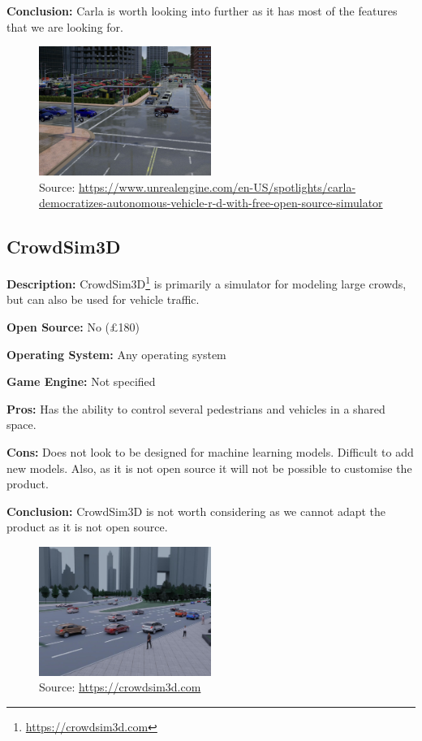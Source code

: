 \textbf{Conclusion:} Carla is worth looking into further as it has most of the features that we are looking for.


\begin{figure}[H]
    \centering
    \includegraphics[width=0.5\textwidth]{Simulators/Carla.JPG}
    \caption{Source: \url{https://www.unrealengine.com/en-US/spotlights/carla-democratizes-autonomous-vehicle-r-d-with-free-open-source-simulator}}
\end{figure}


\subsection{CrowdSim3D}
\textbf{Description:} CrowdSim3D\footnote{\url{https://crowdsim3d.com}} is primarily a simulator for modeling large crowds, but can also be used for vehicle traffic. 

\textbf{Open Source:} No (£180)

\textbf{Operating System:} Any operating system

\textbf{Game Engine:} Not specified

\textbf{Pros:} Has the ability to control several pedestrians and vehicles in a shared space.

\textbf{Cons:} Does not look to be designed for machine learning models. Difficult to add new models. Also, as it is not open source it will not be possible to customise the product. 

\textbf{Conclusion:} CrowdSim3D is not worth considering as we cannot adapt the product as it is not open source. 

\begin{figure}[H]
    \centering
    \includegraphics[width=0.5\textwidth]{Simulators/CrowdSim.JPG}
    \caption{Source: \url{https://crowdsim3d.com}}
\end{figure}


